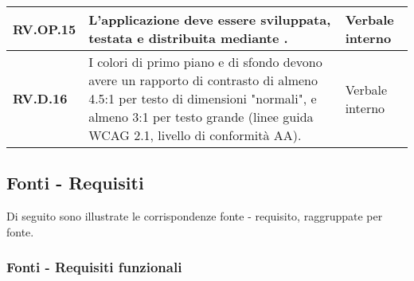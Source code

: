 \begin{adjustwidth}{-0.5cm}{-0.5cm}
\begin{longtable}{|P{3cm}|P{6,5cm}|>{\arraybackslash}P{4cm}|}
    \hline
    \textbf{RV.OP.15} & L'applicazione deve essere sviluppata, testata e distribuita mediante . & Verbale interno \\
    \hline
    \textbf{RV.D.16} & I colori di primo piano e di sfondo devono avere un rapporto di contrasto di almeno 4.5:1 per testo di dimensioni "normali", e almeno 3:1 per testo grande (linee guida WCAG 2.1, livello di conformità AA). & Verbale interno \\
  \end{longtable}
\end{adjustwidth}
\egroup

\subsection{Fonti - Requisiti}
Di seguito sono illustrate le corrispondenze fonte - requisito, raggruppate per fonte.

\subsubsection{Fonti - Requisiti funzionali}

